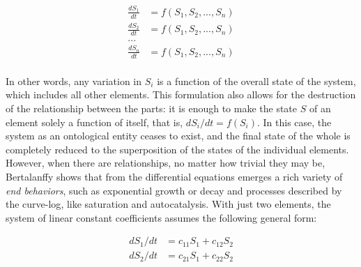 \documentclass[./main_en.tex]{subfiles}
\begin{document}
\begin{linenomath*}
\begin{equation}
\label{eq:systems}
\begin{split}
    \frac{dS_1}{dt} &= f(S_1, S_2, ..., S_n)\\
    \frac{dS_2}{dt} &= f(S_1, S_2, ..., S_n)\\
    ...\\
    \frac{dS_n}{dt} &= f(S_1, S_2, ..., S_n)\\
\end{split}
\end{equation}
\end{linenomath*}
In other words, any variation in $S_i$ is a function of the overall state of the \gls{system}, which includes all other elements. This formulation also allows for the destruction of the relationship between the parts: it is enough to make the state $S$ of an element solely a function of itself, that is, $dS_i/dt = f(S_i)$. In this case, the \gls{system} as an ontological entity ceases to exist, and the final state of the whole is completely reduced to the superposition of the states of the individual elements. However, when there are relationships, no matter how trivial they may be, Bertalanffy shows that from the differential equations emerges a rich variety of \textit{end behaviors}, such as exponential growth or decay and processes described by the \gls{curve-log}, like saturation and autocatalysis. With just two elements, the \gls{system} of linear constant coefficients assumes the following general form:
\begin{linenomath*}
\[
\begin{split}
    dS_1/dt &= c_{11}S_1 + c_{12}S_2\\
    dS_2/dt &= c_{21}S_1 + c_{22}S_2\\
\end{split}
\]
\end{linenomath*}
\end{document}
